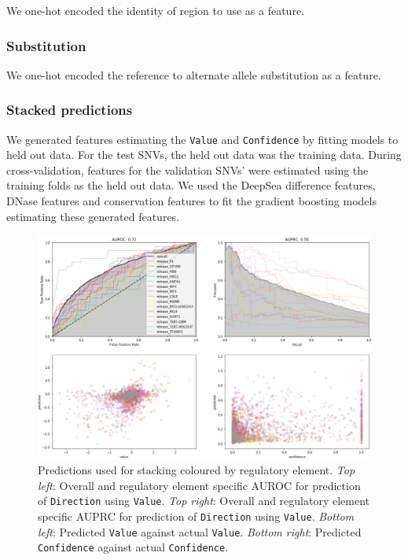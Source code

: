 \documentclass{article}
\begin{document}
We one-hot encoded the identity of region to use as a feature.


\subsubsection*{Substitution}

We one-hot encoded the reference to alternate allele substitution as a feature.


\subsubsection*{Stacked predictions}

We generated features estimating the \texttt{Value} and \texttt{Confidence} by
fitting models to held out data. For the test SNVs, the held out data was the
training data. During cross-validation, features for the validation SNVs' were
estimated using the training folds as the held out data. We used the DeepSea
difference features, DNase features and conservation features to fit the
gradient boosting models estimating these generated features.

\begin{figure}
\includegraphics[width=\textwidth]{fig-stacking-x-validation}
\caption{Predictions used for stacking coloured by regulatory element.
  \emph{Top left}: Overall and regulatory element specific \ac{AUROC} for prediction
  of \texttt{Direction} using \texttt{Value}.
  \emph{Top right}: Overall and regulatory element specific \ac{AUPRC} for prediction
  of \texttt{Direction} using \texttt{Value}.
  \emph{Bottom left}: Predicted \texttt{Value} against actual \texttt{Value}.
  \emph{Bottom right}: Predicted \texttt{Confidence} against actual \texttt{Confidence}.
}
\label{fig:stacking}
\end{figure}
\end{document}
